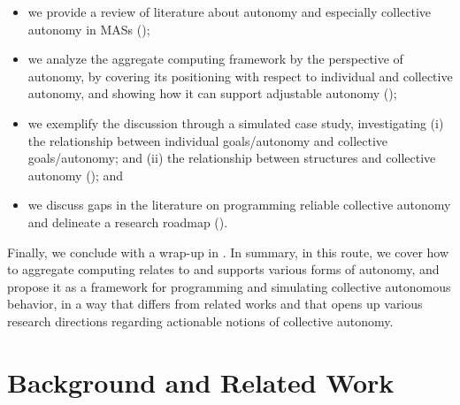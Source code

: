 \documentclass[jsan,article,accept,moreauthors,pdftex]{Definitions/mdpi}
\begin{document}
\begin{itemize}
\item we provide a review of literature about autonomy and especially collective autonomy in MASs ();
\item we analyze the aggregate computing framework by the perspective of autonomy, by covering its positioning with respect to individual and collective autonomy, and showing how it can support adjustable autonomy ();
\item we exemplify the discussion through a simulated case study, investigating (i) the relationship between individual goals/autonomy
 and collective goals/autonomy;
  and (ii) the relationship between structures and collective autonomy (); and
\item we discuss gaps in the literature on programming reliable collective autonomy 
 and delineate a research roadmap ().
\end{itemize}
%
%

Finally, we conclude with a wrap-up in .
%
In summary, in this route,
  we cover how to aggregate computing relates to and supports various forms of autonomy,
  and propose it as a framework
  for {programming} and {simulating}
  collective autonomous behavior,
  in a way that differs from related works
  and that opens up
  various research directions 
  regarding actionable notions of collective autonomy.


\section{Background and Related Work}
\label{s:background-rw}
\end{document}
